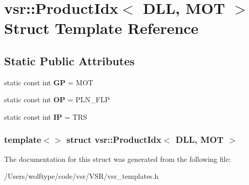 \hypertarget{structvsr_1_1_product_idx_3_01_d_l_l_00_01_m_o_t_01_4}{\section{vsr\-:\-:Product\-Idx$<$ D\-L\-L, M\-O\-T $>$ Struct Template Reference}
\label{structvsr_1_1_product_idx_3_01_d_l_l_00_01_m_o_t_01_4}
}
\subsection*{Static Public Attributes}
\begin{DoxyCompactItemize}
\item 
\hypertarget{structvsr_1_1_product_idx_3_01_d_l_l_00_01_m_o_t_01_4_a8f02f5b6628eab00cb80b2bf9cc3b038}{static const int {\bfseries G\-P} = M\-O\-T}\label{structvsr_1_1_product_idx_3_01_d_l_l_00_01_m_o_t_01_4_a8f02f5b6628eab00cb80b2bf9cc3b038}

\item 
\hypertarget{structvsr_1_1_product_idx_3_01_d_l_l_00_01_m_o_t_01_4_ac228b12b17e7b2485eb46af395d41f2e}{static const int {\bfseries O\-P} = P\-L\-N\-\_\-\-F\-L\-P}\label{structvsr_1_1_product_idx_3_01_d_l_l_00_01_m_o_t_01_4_ac228b12b17e7b2485eb46af395d41f2e}

\item 
\hypertarget{structvsr_1_1_product_idx_3_01_d_l_l_00_01_m_o_t_01_4_a1177d0d8266db3177541b561c942b7f6}{static const int {\bfseries I\-P} = T\-R\-S}\label{structvsr_1_1_product_idx_3_01_d_l_l_00_01_m_o_t_01_4_a1177d0d8266db3177541b561c942b7f6}

\end{DoxyCompactItemize}
\subsubsection*{template$<$$>$ struct vsr\-::\-Product\-Idx$<$ D\-L\-L, M\-O\-T $>$}



The documentation for this struct was generated from the following file\-:\begin{DoxyCompactItemize}
\item 
/\-Users/wolftype/code/vsr/\-V\-S\-R/vsr\-\_\-templates.\-h\end{DoxyCompactItemize}
